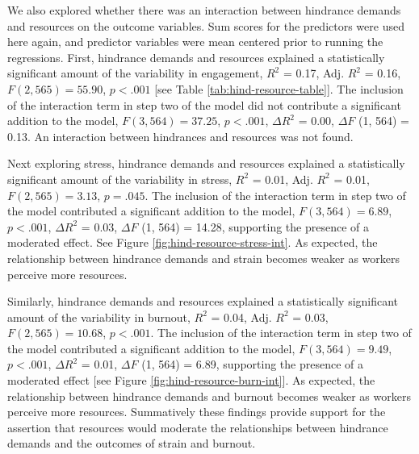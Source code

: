 \documentclass[
  man,mask]{apa7}
\begin{document}
We also explored whether there was an interaction between hindrance demands and resources on the outcome variables. Sum scores for the predictors were used here again, and predictor variables were mean centered prior to running the regressions. First, hindrance demands and resources explained a statistically significant amount of the variability in engagement, \(R^2\) = 0.17, Adj. \(R^2\) = 0.16, \(F(2, 565) = 55.90\), \(p < .001\) {[}see Table \ref{tab:hind-resource-table}{]}. The inclusion of the interaction term in step two of the model did not contribute a significant addition to the model, \(F(3, 564) = 37.25\), \(p < .001\), \(\Delta R^2\) = 0.00, \(\Delta F\) (1, 564) = 0.13. An interaction between hindrances and resources was not found.

Next exploring stress, hindrance demands and resources explained a statistically significant amount of the variability in stress, \(R^2\) = 0.01, Adj. \(R^2\) = 0.01, \(F(2, 565) = 3.13\), \(p = .045\). The inclusion of the interaction term in step two of the model contributed a significant addition to the model, \(F(3, 564) = 6.89\), \(p < .001\), \(\Delta R^2\) = 0.03, \(\Delta F\) (1, 564) = 14.28, supporting the presence of a moderated effect. See Figure \ref{fig:hind-resource-stress-int}. As expected, the relationship between hindrance demands and strain becomes weaker as workers perceive more resources.

Similarly, hindrance demands and resources explained a statistically significant amount of the variability in burnout, \(R^2\) = 0.04, Adj. \(R^2\) = 0.03, \(F(2, 565) = 10.68\), \(p < .001\). The inclusion of the interaction term in step two of the model contributed a significant addition to the model, \(F(3, 564) = 9.49\), \(p < .001\), \(\Delta R^2\) = 0.01, \(\Delta F\) (1, 564) = 6.89, supporting the presence of a moderated effect {[}see Figure \ref{fig:hind-resource-burn-int}{]}. As expected, the relationship between hindrance demands and burnout becomes weaker as workers perceive more resources. Summatively these findings provide support for the assertion that resources would moderate the relationships between hindrance demands and the outcomes of strain and burnout.
\end{document}

